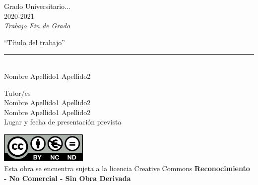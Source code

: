 \documentclass[12pt]{report} %
\begin{document}
	
\begin{titlepage}
	\begin{sffamily}
	\color{azulUC3M}
	\begin{center}
		\begin{figure}[H] %
		\end{figure}
		\vspace{2.5cm}
		\begin{Large}
			Grado Universitario...\\			
			 2020-2021\\ %
			\vspace{2cm}		
			\textsl{Trabajo Fin de Grado}
			\bigskip
			
		\end{Large}
		 	{\Huge ``Título del trabajo''}\\
		 	\vspace*{0.5cm}
	 		\rule{10.5cm}{0.1mm}\\
			\vspace*{0.9cm}
			{\LARGE Nombre Apellido1 Apellido2}\\ 
			\vspace*{1cm}
		\begin{Large}
			Tutor/es\\
			Nombre Apellido1 Apellido2\\
			Nombre Apellido1 Apellido2\\
			Lugar y fecha de presentación prevista\\
		\end{Large}
	\end{center}
	\vfill
	\color{black}
	\includegraphics[width=4.2cm]{creativecommons.png}\\ %
	Esta obra se encuentra sujeta a la licencia Creative Commons \textbf{Reconocimiento - No Comercial - Sin Obra Derivada}
	\end{sffamily}
\end{titlepage}
\end{document}
